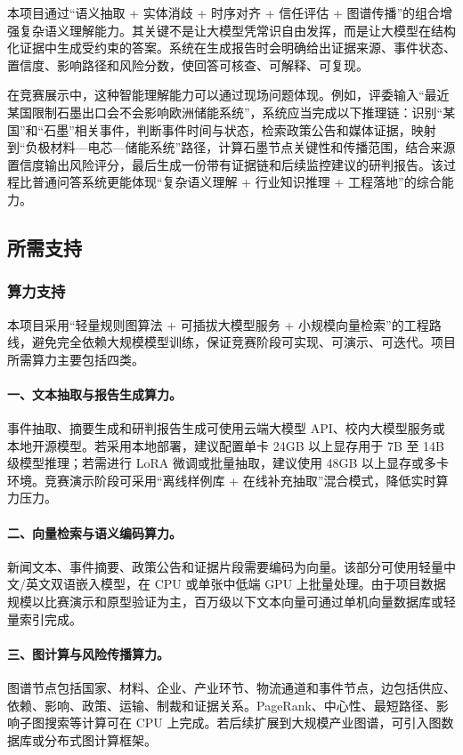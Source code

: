 \documentclass[12pt,a4paper]{article}
\begin{document}
本项目通过“语义抽取 + 实体消歧 + 时序对齐 + 信任评估 + 图谱传播”的组合增强复杂语义理解能力。其关键不是让大模型凭常识自由发挥，而是让大模型在结构化证据中生成受约束的答案。系统在生成报告时会明确给出证据来源、事件状态、置信度、影响路径和风险分数，使回答可核查、可解释、可复现。

在竞赛展示中，这种智能理解能力可以通过现场问题体现。例如，评委输入“最近某国限制石墨出口会不会影响欧洲储能系统”，系统应当完成以下推理链：识别“某国”和“石墨”相关事件，判断事件时间与状态，检索政策公告和媒体证据，映射到“负极材料—电芯—储能系统”路径，计算石墨节点关键性和传播范围，结合来源置信度输出风险评分，最后生成一份带有证据链和后续监控建议的研判报告。该过程比普通问答系统更能体现“复杂语义理解 + 行业知识推理 + 工程落地”的综合能力。

\subsection{所需支持}

\subsubsection{算力支持}

本项目采用“轻量规则图算法 + 可插拔大模型服务 + 小规模向量检索”的工程路线，避免完全依赖大规模模型训练，保证竞赛阶段可实现、可演示、可迭代。项目所需算力主要包括四类。

\paragraph{一、文本抽取与报告生成算力。}事件抽取、摘要生成和研判报告生成可使用云端大模型 API、校内大模型服务或本地开源模型。若采用本地部署，建议配置单卡 24GB 以上显存用于 7B 至 14B 级模型推理；若需进行 LoRA 微调或批量抽取，建议使用 48GB 以上显存或多卡环境。竞赛演示阶段可采用“离线样例库 + 在线补充抽取”混合模式，降低实时算力压力。

\paragraph{二、向量检索与语义编码算力。}新闻文本、事件摘要、政策公告和证据片段需要编码为向量。该部分可使用轻量中文/英文双语嵌入模型，在 CPU 或单张中低端 GPU 上批量处理。由于项目数据规模以比赛演示和原型验证为主，百万级以下文本向量可通过单机向量数据库或轻量索引完成。

\paragraph{三、图计算与风险传播算力。}图谱节点包括国家、材料、企业、产业环节、物流通道和事件节点，边包括供应、依赖、影响、政策、运输、制裁和证据关系。PageRank、中心性、最短路径、影响子图搜索等计算可在 CPU 上完成。若后续扩展到大规模产业图谱，可引入图数据库或分布式图计算框架。
\end{document}
